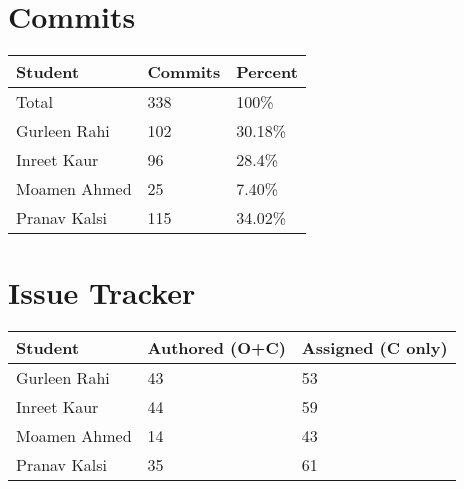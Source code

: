 \documentclass{article}
\begin{document}

\section{Commits}


\begin{table}[H]
\centering
\begin{tabular}{lll}
\toprule
\textbf{Student} & \textbf{Commits} & \textbf{Percent}\\
\midrule
Total & 338 & 100\% \\
Gurleen Rahi & 102 & 30.18\% \\
Inreet Kaur & 96 & 28.4\% \\
Moamen Ahmed & 25 & 7.40\% \\
Pranav Kalsi & 115 & 34.02\% \\
\bottomrule
\end{tabular}
\end{table}


\section{Issue Tracker}


\begin{table}[H]
\centering
\begin{tabular}{lll}
\toprule
\textbf{Student} & \textbf{Authored (O+C)} & \textbf{Assigned (C only)}\\
\midrule
Gurleen Rahi & 43 & 53\\
Inreet Kaur & 44 & 59\\
Moamen Ahmed & 14 & 43\\
Pranav Kalsi & 35 & 61\\
\bottomrule
\end{tabular}
\end{table}
\end{document}
